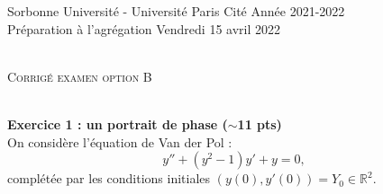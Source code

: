 \documentclass[11pt,a4paper]{article}
\newcommand{\R}{\mathbb R}
\begin{document}

\noindent 
Sorbonne Universit\'e - Université Paris Cité     \hfill   Ann\'ee 2021-2022 \\
Pr\'eparation \`a  l'agr\'egation        \hfill     Vendredi 15 avril 2022 \\ %
\noindent {\rule{\textwidth}{.2mm}}\\[-5mm]
\begin{center}
{\large \textsc{Corrigé examen option B} }\\[-5mm]
\end{center}
\noindent {\rule{\textwidth}{.2mm}}\\[1cm]



{\bf Exercice 1 : un portrait de phase ($\sim$11 pts)} \vspace{0.1cm}\\
On considère l'\'equation de Van der Pol : 
\begin{equation}\label{EDO}
  y'' + (y^2-1) y' + y = 0 ,
\end{equation}
compl\'et\'ee par les conditions initiales $(y(0), y'(0))=Y_0 \in \R^2$.
\end{document}
